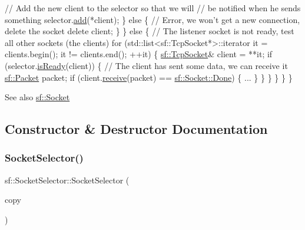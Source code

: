 \begin{DoxyCode}
                \textcolor{comment}{// Add the new client to the selector so that we will}
                \textcolor{comment}{// be notified when he sends something}
                selector.\hyperlink{classsf_1_1_socket_selector_ade952013232802ff7b9b33668f8d2096}{add}(*client);
            \}
            \textcolor{keywordflow}{else}
            \{
                \textcolor{comment}{// Error, we won't get a new connection, delete the socket}
                \textcolor{keyword}{delete} client;
            \}
        \}
        \textcolor{keywordflow}{else}
        \{
            \textcolor{comment}{// The listener socket is not ready, test all other sockets (the clients)}
            \textcolor{keywordflow}{for} (std::list<sf::TcpSocket*>::iterator it = clients.begin(); it != clients.end(); ++it)
            \{
                \hyperlink{classsf_1_1_tcp_socket}{sf::TcpSocket}& client = **it;
                \textcolor{keywordflow}{if} (selector.\hyperlink{classsf_1_1_socket_selector_a917a4bac708290a6782e6686fd3bf889}{isReady}(client))
                \{
                    \textcolor{comment}{// The client has sent some data, we can receive it}
                    \hyperlink{classsf_1_1_packet}{sf::Packet} packet;
                    \textcolor{keywordflow}{if} (client.\hyperlink{classsf_1_1_tcp_socket_a90ce50811ea61d4f00efc62bb99ae1af}{receive}(packet) == \hyperlink{classsf_1_1_socket_a51bf0fd51057b98a10fbb866246176dca1de3a85bc56d3ae85b3d0f3cfd04ae90}{sf::Socket::Done})
                    \{
                        ...
                    \}
                \}
            \}
        \}
    \}
\}
\end{DoxyCode}


\begin{DoxySeeAlso}{See also}
\hyperlink{classsf_1_1_socket}{sf\+::\+Socket} 
\end{DoxySeeAlso}


\subsection{Constructor \& Destructor Documentation}
\mbox{\label{classsf_1_1_socket_selector_a50b1b955eb7ecb2e7c2764f3f4722fbf}} 
\subsubsection{\texorpdfstring{Socket\+Selector()}{SocketSelector()}}
{\footnotesize\ttfamily sf\+::\+Socket\+Selector\+::\+Socket\+Selector (\begin{DoxyParamCaption}\item[{const \hyperlink{classsf_1_1_socket_selector}{Socket\+Selector} \&}]{copy }\end{DoxyParamCaption})}




